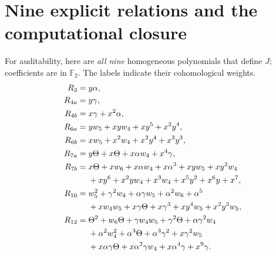 \documentclass[11pt,a4paper]{article}
\theoremstyle{remark}\newtheorem{remark}[theorem]{Remark}
\newcommand{\F}{\mathbb F}
\begin{document}
\section{Nine explicit relations and the computational closure}\label{sec:relations}
For auditability, here are \emph{all nine} homogeneous polynomials that define \(J\); coefficients are in \(\F_2\). The labels indicate their cohomological weights.
\begin{align}
R_3={}&y\alpha,\label{eq:r3}\\
R_{4a}={}&y\gamma,\\
R_{4b}={}&x\gamma+x^2\alpha,\\
R_{6a}={}&yw_5+xyw_4+xy^5+x^2y^4,\\
R_{6b}={}&xw_5+x^2w_4+x^2y^4+x^3y^3,\\
R_{7a}={}&y\Theta+x\Theta+x\alpha w_4+x^4\gamma,\label{eq:r7a}\\
R_{7b}={}&x\Theta+xw_6+x\alpha w_4+x\alpha^3
+xyw_5+xy^2w_4\notag\\
&+xy^6+x^2yw_4+x^3w_4+x^5y^2+x^6y+x^7,\label{eq:r7b}\\
R_{10}={}&w_5^2+\gamma^2w_4+\alpha\gamma w_5+\alpha^2w_6+\alpha^5\notag\\
&+xw_4w_5+x\gamma\Theta+x\gamma^3+xy^4w_5+x^2y^3w_5,\label{eq:r10}\\
R_{12}={}&\Theta^2+w_6\Theta+\gamma w_4w_5+\gamma^2\Theta
+\alpha\gamma^2w_4\notag\\
&+\alpha^2w_4^2+\alpha^3\Theta+\alpha^3\gamma^2+x\gamma^2w_5\notag\\
&+x\alpha\gamma\Theta+x\alpha^2\gamma w_4+x\alpha^4\gamma+x^9\gamma.\label{eq:r12}
\end{align}
\end{document}
